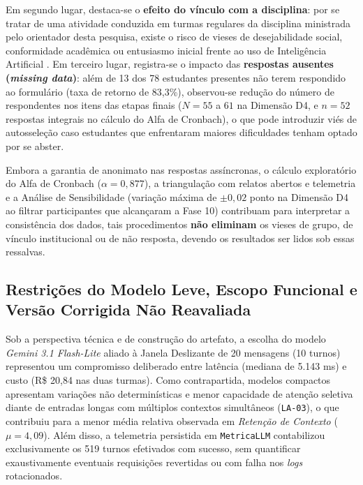 Em segundo lugar, destaca-se o \textbf{efeito do vínculo com a disciplina}: por se tratar de uma atividade conduzida em turmas regulares da disciplina ministrada pelo orientador desta pesquisa, existe o risco de vieses de desejabilidade social, conformidade acadêmica ou entusiasmo inicial frente ao uso de Inteligência Artificial \cite{junior2025}. Em terceiro lugar, registra-se o impacto das \textbf{respostas ausentes (\textit{missing data})}: além de 13 dos 78 estudantes presentes não terem respondido ao formulário (taxa de retorno de 83,3\%), observou-se redução do número de respondentes nos itens das etapas finais ($N = 55$ a $61$ na Dimensão D4, e $n = 52$ respostas integrais no cálculo do Alfa de Cronbach), o que pode introduzir viés de autosseleção caso estudantes que enfrentaram maiores dificuldades tenham optado por se abster.

Embora a garantia de anonimato nas respostas assíncronas, o cálculo exploratório do Alfa de Cronbach ($\alpha = 0,877$), a triangulação com relatos abertos e telemetria e a Análise de Sensibilidade (variação máxima de $\pm 0,02$ ponto na Dimensão D4 ao filtrar participantes que alcançaram a Fase 10) contribuam para interpretar a consistência dos dados, tais procedimentos \textbf{não eliminam} os vieses de grupo, de vínculo institucional ou de não resposta, devendo os resultados ser lidos sob essas ressalvas.

\subsection{Restrições do Modelo Leve, Escopo Funcional e Versão Corrigida Não Reavaliada}

Sob a perspectiva técnica e de construção do artefato, a escolha do modelo \textit{Gemini 3.1 Flash-Lite} aliado à Janela Deslizante de 20 mensagens (10 turnos) representou um compromisso deliberado entre latência (mediana de 5.143 ms) e custo (R\$ 20,84 nas duas turmas). Como contrapartida, modelos compactos apresentam variações não determinísticas e menor capacidade de atenção seletiva diante de entradas longas com múltiplos contextos simultâneos (\texttt{LA-03}), o que contribuiu para a menor média relativa observada em \textit{Retenção de Contexto} ($\mu = 4,09$). Além disso, a telemetria persistida em \texttt{MetricaLLM} contabilizou exclusivamente os 519 turnos efetivados com sucesso, sem quantificar exaustivamente eventuais requisições revertidas ou com falha nos \textit{logs} rotacionados.

